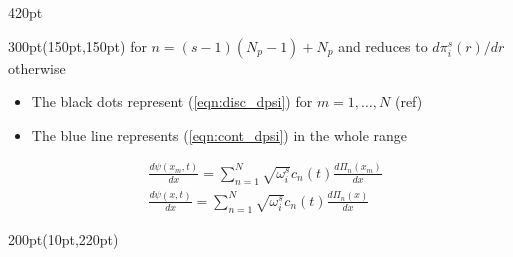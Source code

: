 \begin{frame}
\begin{textblock*}{420pt}
\end{textblock*}

\begin{textblock*}{300pt}(150pt,150pt)
\footnotesize
\noindent for $n = (s-1)(N_p-1) + N_p$ and reduces to $d\pi^s_i(r)/dr$ otherwise
\begin{itemize}
\item The black dots represent (\ref{eqn:disc_dpsi}) for $m=1,\ldots,N$ 
(ref)
\item The blue line represents (\ref{eqn:cont_dpsi}) in the whole range
\end{itemize}
 \begin{align}
 & \frac{d\psi(x_{m},t)}{dx} = \sum_{n=1}^{N} \sqrt{\omega^s_i}
           c_n(t)\frac{d\Pi_n(x_{m})}{dx} \label{eqn:disc_dpsi}\\
 & \frac{d\psi(x,t)}{dx} = \sum_{n=1}^{N} \sqrt{\omega^s_i}
           c_n(t)\frac{d\Pi_n(x)}{dx} \label{eqn:cont_dpsi}
 \end{align}


\end{textblock*}



\begin{textblock*}{200pt}(10pt,220pt)
\footnotesize
	{\color{red}{The values for $n^\prime = (s-1)(N_p-1)+N_p$ are off}}
\end{textblock*}

\end{frame}






